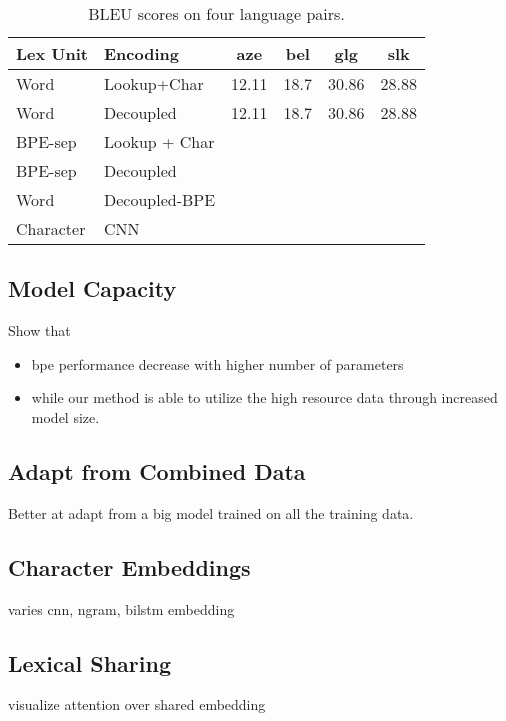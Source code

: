 \begin{table}[h]
    \centering
    \begin{tabular}{ll|cccc}
   Lex Unit & Encoding & aze & bel & glg & slk \\
    \midrule
    Word & Lookup+Char & 12.11 & 18.7 & 30.86 & 28.88 \\
    Word & Decoupled & 12.11 & 18.7 & 30.86 & 28.88 \\
    \midrule
    BPE-sep & Lookup + Char &  &  &  &  \\
    BPE-sep & Decoupled &  &  &  &  \\
    Word & Decoupled-BPE &  &  &  &  \\
    Character & CNN &  &  &  &  \\
    \end{tabular}
    \caption{BLEU scores on four language pairs.}
    \label{tab:lex_bound}
\end{table}

\subsection{Model Capacity}
Show that
\begin{itemize}
    \item bpe performance decrease with higher number of parameters
    \item while our method is able to utilize the high resource data through increased model size. 
\end{itemize}


\subsection{Adapt from Combined Data}
Better at adapt from a big model trained on all the training data.

\subsection{Character Embeddings}
varies cnn, ngram, bilstm embedding 

\subsection{Lexical Sharing}
visualize attention over shared embedding